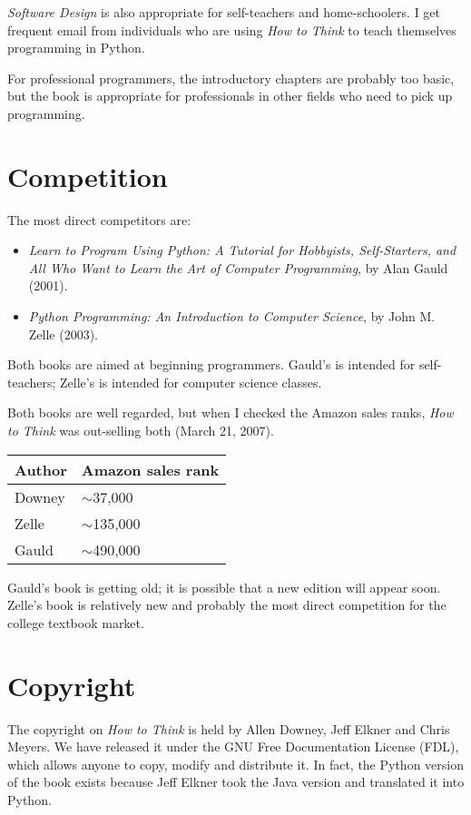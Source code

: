\documentclass{article}
\begin{document}
{\em Software Design} is also appropriate for self-teachers and
home-schoolers.  I get frequent email from individuals who are using
{\em How to Think} to teach themselves programming in Python.

For professional programmers, the introductory chapters are probably
too basic, but the book is appropriate for professionals in other
fields who need to pick up programming.


\section*{Competition}

The most direct competitors are:

\begin{itemize}
\item {\em Learn to Program Using Python: A Tutorial for Hobbyists,
Self-Starters, and All Who Want to Learn the Art of Computer
Programming}, by Alan Gauld (2001).

\item {\em Python Programming: An Introduction to Computer Science}, by John
M. Zelle (2003).
\end{itemize}

Both books are aimed at beginning programmers.  Gauld's is intended
for self-teachers; Zelle's is intended for computer science classes.

Both books are well regarded, but when I checked the Amazon
sales ranks, {\em How to Think} was out-selling both (March 21, 2007).

\begin{tabular}{l|l}
Author	&	 Amazon sales rank\\
\hline
Downey	&         $\sim$37,000\\
Zelle   &         $\sim$135,000\\
Gauld	&	 $\sim$490,000\\
\end{tabular}

Gauld's book is getting old; it is possible that a new edition
will appear soon.  Zelle's book is relatively new and probably
the most direct competition for the college textbook market.


\section*{Copyright}

The copyright on {\em How to Think} is held by Allen Downey, Jeff Elkner
and Chris Meyers.  We have released it under the GNU Free
Documentation License (FDL), which allows anyone to copy, modify and
distribute it.  In fact, the Python version of the book exists because
Jeff Elkner took the Java version and translated it into Python.
\end{document}
